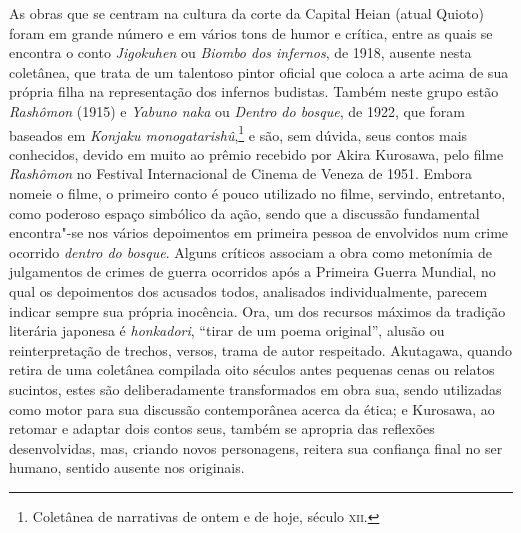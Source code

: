 As obras que se centram na cultura da corte da Capital Heian (atual
Quioto) foram em grande número e em vários tons de humor e crítica,
entre as quais se encontra o conto \textit{Jigokuhen} ou \textit{Biombo dos infernos}, de 1918, ausente nesta coletânea, que trata de um
talentoso pintor oficial que coloca a arte acima de sua própria filha
na representação dos infernos budistas. Também neste grupo estão
\textit{Rashômon} (1915) e \textit{Yabuno naka} ou \textit{Dentro do bosque}, de 1922, 
que foram baseados em \textit{Konjaku monogatarishû},\footnote{Coletânea de narrativas de ontem e de hoje, século \textsc{xii}.} e são, sem
dúvida, seus contos mais conhecidos, devido em muito ao prêmio recebido
por Akira Kurosawa, pelo filme \textit{Rashômon} no Festival
Internacional de Cinema de Veneza de 1951. Embora nomeie o filme, o
primeiro conto é pouco utilizado no filme, servindo, entretanto, como
poderoso espaço simbólico da ação, sendo que a discussão fundamental
encontra"-se nos vários depoimentos em primeira pessoa de envolvidos num
crime ocorrido \textit{dentro do bosque}. Alguns críticos associam a obra como
metonímia de julgamentos de crimes de guerra ocorridos após a Primeira
Guerra Mundial, no qual os depoimentos dos acusados todos, analisados
individualmente, parecem indicar sempre sua própria inocência. Ora, um
dos recursos máximos da tradição literária japonesa é \textit{honkadori}, ``tirar de um poema original'', alusão ou reinterpretação de trechos,
versos, trama de autor respeitado. Akutagawa, quando retira de uma
coletânea compilada oito séculos antes pequenas cenas ou relatos
sucintos, estes são deliberadamente transformados em obra sua, sendo 
utilizadas como motor para sua discussão contemporânea acerca da ética;
e Kurosawa, ao retomar e adaptar dois contos seus, também se apropria
das reflexões desenvolvidas, mas, criando novos personagens, reitera
sua confiança final no ser humano, sentido ausente nos originais.

